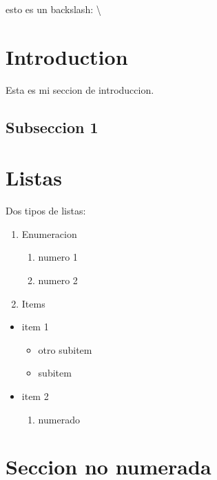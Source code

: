 \documentclass[12pt, a4paper]{article} %
\begin{document}
esto es un backslash: \textbackslash

\section{Introduction}

Esta es mi seccion de introduccion. 

\subsection{Subseccion 1}

\lipsum[5] %

\section{Listas}

Dos tipos de listas: 

\begin{enumerate}
    \item Enumeracion
    \begin{enumerate}
        \item numero 1
        \item numero 2
    \end{enumerate}
    \item Items
\end{enumerate}


\begin{itemize}
    \item item 1
        \begin{itemize}
            \item otro subitem
            \item subitem
        \end{itemize}
    \item item 2
    \begin{enumerate}
        \item numerado
    \end{enumerate}
\end{itemize}

\section*{Seccion no numerada}
\end{document}
